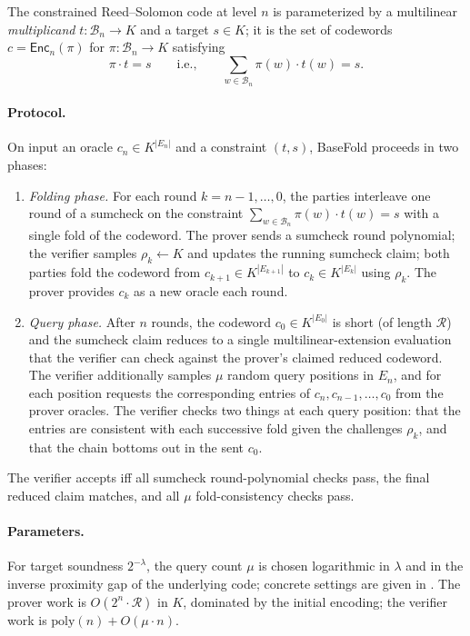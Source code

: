 \documentclass{article}
\theoremstyle{definition}
\newcommand{\BB}{\mathcal{B}}
\begin{document}
The constrained Reed--Solomon code at level $n$ is parameterized by a multilinear \emph{multiplicand} $t \colon \BB_n \to K$ and a target $s \in K$; it is the set of codewords $c = \textsf{Enc}_n(\pi)$ for $\pi \colon \BB_n \to K$ satisfying
\[
  \pi \cdot t = s \qquad \text{i.e.,} \qquad \sum_{w \in \BB_n} \pi(w) \cdot t(w) = s.
\]

\paragraph{Protocol.}
On input an oracle $c_n \in K^{|E_n|}$ and a constraint $(t, s)$, BaseFold proceeds in two phases:

\begin{enumerate}
\item \emph{Folding phase.} For each round $k = n - 1, \ldots, 0$, the parties interleave one round of a sumcheck on the constraint $\sum_{w \in \BB_n} \pi(w) \cdot t(w) = s$ with a single fold of the codeword. The prover sends a sumcheck round polynomial; the verifier samples $\rho_k \gets K$ and updates the running sumcheck claim; both parties fold the codeword from $c_{k + 1} \in K^{|E_{k + 1}|}$ to $c_k \in K^{|E_k|}$ using $\rho_k$. The prover provides $c_k$ as a new oracle each round.
\item \emph{Query phase.} After $n$ rounds, the codeword $c_0 \in K^{|E_0|}$ is short (of length $\mathcal{R}$) and the sumcheck claim reduces to a single multilinear-extension evaluation that the verifier can check against the prover's claimed reduced codeword. The verifier additionally samples $\mu$ random query positions in $E_n$, and for each position requests the corresponding entries of $c_n, c_{n - 1}, \ldots, c_0$ from the prover oracles. The verifier checks two things at each query position: that the entries are consistent with each successive fold given the challenges $\rho_k$, and that the chain bottoms out in the sent $c_0$.
\end{enumerate}

The verifier accepts iff all sumcheck round-polynomial checks pass, the final reduced claim matches, and all $\mu$ fold-consistency checks pass.

\paragraph{Parameters.}
For target soundness $2^{-\lambda}$, the query count $\mu$ is chosen logarithmic in $\lambda$ and in the inverse proximity gap of the underlying code; concrete settings are given in \cite{Habock:2024ab}. The prover work is $O(2^n \cdot \mathcal{R})$ in $K$, dominated by the initial encoding; the verifier work is $\text{poly}(n) + O(\mu \cdot n)$.
\end{document}
